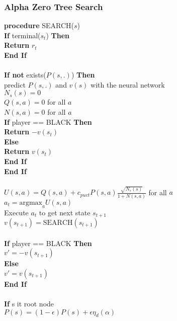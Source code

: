 \documentclass{article}
\begin{document}
\subsubsection{Alpha Zero Tree Search}
\textbf{procedure} SEARCH($s$) \\
\indent \textbf{If} terminal($s_t$) \textbf{Then} \\
\indent \indent \textbf{Return} $r_t$ \\
\indent \textbf{End If} \\
\\
\indent \textbf{If not} exists($P(s, .)$) \textbf{Then} \\
\indent \indent predict $P(s, .)$ and $v(s)$ with the neural network \\
\indent \indent $N_s(s) = 0$ \\
\indent \indent $Q(s, a) = 0$ for all $a$ \\
\indent \indent $N(s, a) = 0$ for all $a$ \\
\indent \indent \textbf{If} player == BLACK \textbf{Then} \\
\indent \indent \indent \textbf{Return} $-v(s_{t})$ \\
\indent \indent \textbf{Else} \\
\indent \indent \indent \textbf{Return} $v(s_{t})$ \\
\indent \indent \textbf{End If} \\
\indent \textbf{End If} \\
\\
\indent $U(s,a) = Q(s,a) + c_{puct} P(s,a) \frac{\sqrt{N_s(s)}}{1 + N(s,a)}$ for all $a$ \\
\indent $a_t = \text{argmax}_a U(s,a)$ \\
\indent Execute $a_t$ to get next state $s_{t+1}$ \\
\indent $v(s_{t+1}) = \text{SEARCH}(s_{t+1})$ \\
\\
\indent \textbf{If} player == BLACK \textbf{Then} \\
\indent \indent $v' = -v(s_{t+1})$ \\
\indent \textbf{Else} \\
\indent \indent $v' = v(s_{t+1})$ \\
\indent \textbf{End If} \\
\\
\indent \textbf{If} s it root node \\
\indent \indent $P(s) = (1-\epsilon) P(s) + \epsilon \eta_d(\alpha)$ \\
\end{document}
